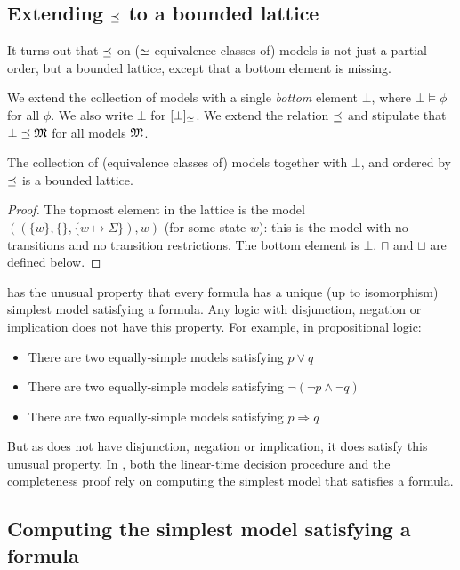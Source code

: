 \subsection{Extending $\preceq$ to a bounded lattice}
\label{boundedlattice}
It turns out that $\preceq $ on ($\simeq$-equivalence classes of)
models is not just a partial order, but a bounded lattice, except
that a bottom element is missing.

\begin{definition}
We extend the collection of models with a single \emph{bottom} element
$\bot$, where $\bot \models \phi$ for all $\phi$. We also write $\bot$
for $[\bot]_{\simeq}$.  We extend the relation $\preceq $ and
stipulate that $\bot \preceq \frak{M}$ for all models $\frak{M}$.
\end{definition}

\begin{theorem}
The collection of (equivalence classes of) models together with
$\bot$, and ordered by $\preceq$ is a bounded lattice.
\end{theorem}
\begin{proof}
The topmost element in the
lattice is the model $( (\{w\}, \{\}, \{w \mapsto \Sigma\}), w)$ (for
some state $w$): this is the model with no transitions and no
transition restrictions.
The bottom element is $\bot$. 
$\sqcap$ and $\sqcup$ are defined below.
\end{proof}

\ELABR{} has the unusual property that every formula has a unique (up to isomorphism) simplest  model satisfying a formula. 
Any logic with disjunction, negation or implication does not have this property.
For example, in propositional logic:
\begin{itemize}
\item
There are two equally-simple models satisfying $p \lor q$
\item
There are two equally-simple  models satisfying $\neg (\neg p \land \neg q)$
\item
There are two equally-simple models satisfying $p \Rightarrow q$
\end{itemize}
But as \ELABR{} does not have disjunction, negation or implication, it does satisfy this unusual property.
In \ELABR{}, both the linear-time decision procedure and the completeness proof rely on computing the simplest model that satisfies a formula. 

\subsection{Computing the simplest model satisfying a formula}
\label{simpl}

